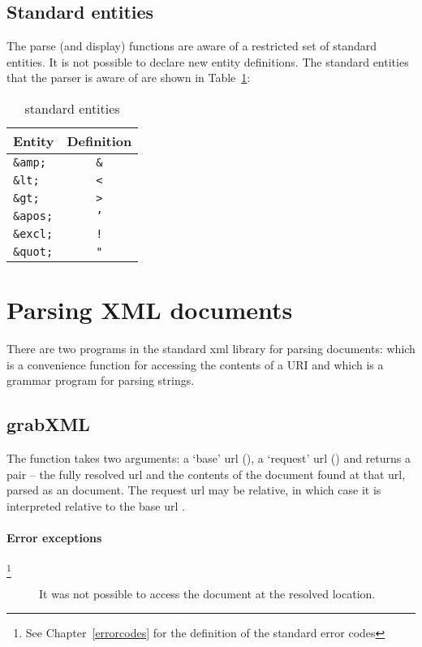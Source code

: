 \subsection{Standard entities}
\label{xml:entities}
The \go parse (and display) functions are aware of a restricted set of standard entities. It is not possible to declare new entity definitions. The standard entities that the parser is aware of are shown in Table~\ref{xml:standardentities}:
\begin{table}[h]
\begin{center}
\begin{tabular}{|l|c|}
\hline
Entity&Definition\\
\hline
\tt \&amp;&\tt\&\\
\tt \&lt;&\tt<\\
\tt \&gt;&\tt>\\
\tt \&apos;&\tt'\\
\tt \&excl;&\tt!\\
\tt \&quot;&\tt"\\
\hline
\end{tabular}
\end{center}
\caption{\go standard entities}\label{xml:standardentities}
\end{table}

\section{Parsing XML documents}
\label{xml:parse}

There are two programs in the standard xml library for parsing documents:  which is a convenience function for accessing the contents of a URI and  which is a grammar program for parsing strings.

\subsection{grabXML}

The  function takes two  arguments: a `base' url (), a `request' url () and returns a pair -- the fully resolved url and the contents of the document found at that url, parsed as an  document. The request url may be relative, in which case it is interpreted relative to the base url .

\paragraph{Error exceptions}\footnote{See Chapter~\vref{errorcodes} for the definition of the standard error codes}
\begin{description}
\item[]
It was not possible to access the document at the resolved location.
\end{description}

